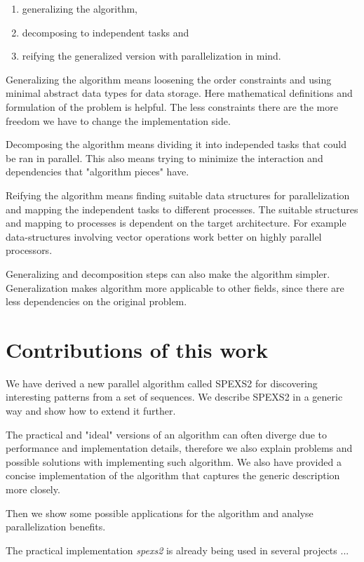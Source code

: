 \begin{enumerate}
	\item generalizing the algorithm,
	\item decomposing to independent tasks and
	\item reifying the generalized version with parallelization in mind.
\end{enumerate}

Generalizing the algorithm means loosening the order constraints and using minimal abstract data types for data storage. Here mathematical definitions and formulation of the problem is helpful. The less constraints there are the more freedom we have to change the implementation side.

Decomposing the algorithm means dividing it into independed tasks that could be ran in parallel. This also means trying to minimize the interaction and dependencies that "algorithm pieces" have.

Reifying the algorithm means finding suitable data structures for parallelization and mapping the independent tasks to different processes. The suitable structures and mapping to processes is dependent on the target architecture. For example data-structures involving vector operations work better on highly parallel processors.

Generalizing and decomposition steps can also make the algorithm simpler. Generalization makes algorithm more applicable to other fields, since there are less dependencies on the original problem.

\section{Contributions of this work}

We have derived a new parallel algorithm called SPEXS2 for discovering interesting patterns from a set of sequences. We describe SPEXS2 in a generic way and show how to extend it further. 

The practical and "ideal" versions of an algorithm can often diverge due to performance and implementation details, therefore we also explain problems and possible solutions with implementing such algorithm. We also have provided a concise implementation of the algorithm that captures the generic description more closely.

Then we show some possible applications for the algorithm and analyse parallelization benefits.

The practical implementation \emph{spexs2} is already being used in several projects ... 

